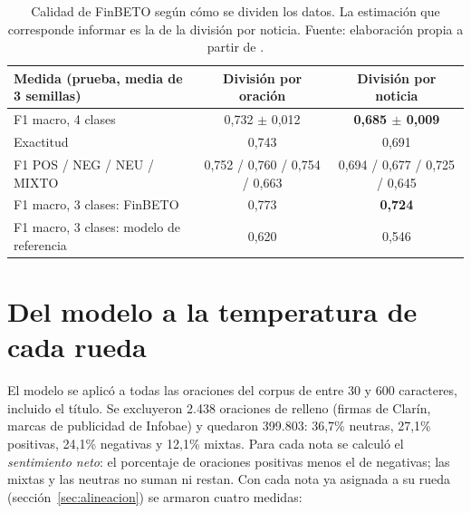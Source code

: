 \begin{table}[H]
\centering\footnotesize
\begin{tabular}{@{}lcc@{}}
\toprule
\textbf{Medida (prueba, media de 3 semillas)} & \textbf{División por oración} & \textbf{División por noticia} \\
\midrule
F1 macro, 4 clases & 0,732 $\pm$ 0,012 & \textbf{0,685 $\pm$ 0,009} \\
Exactitud & 0,743 & 0,691 \\
F1 POS / NEG / NEU / MIXTO & 0,752 / 0,760 / 0,754 / 0,663 & 0,694 / 0,677 / 0,725 / 0,645 \\
\midrule
F1 macro, 3 clases: FinBETO & 0,773 & \textbf{0,724} \\
F1 macro, 3 clases: modelo de referencia & 0,620 & 0,546 \\
\bottomrule
\end{tabular}
\caption{Calidad de FinBETO según cómo se dividen los datos. La estimación que corresponde
informar es la de la división por noticia. Fuente: elaboración propia a partir de
.}
\label{tab:finbeto}
\end{table}


\section{Del modelo a la temperatura de cada rueda}
\label{sec:tono-rueda}

El modelo se aplicó a todas las oraciones del corpus de entre 30 y 600 caracteres, incluido el
título. Se excluyeron 2.438 oraciones de relleno (firmas de Clarín, marcas de publicidad de
Infobae) y quedaron 399.803: 36,7\% neutras, 27,1\% positivas, 24,1\% negativas y 12,1\%
mixtas. Para cada nota se calculó el \textit{sentimiento neto}: el porcentaje de oraciones
positivas menos el de negativas; las mixtas y las neutras no suman ni restan. Con cada nota ya
asignada a su rueda (sección~\ref{sec:alineacion}) se armaron cuatro medidas:


